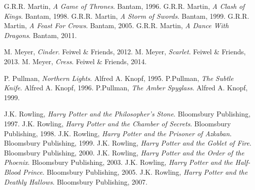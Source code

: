 \begin{thebibliography}{47}
    G.R.R. Martin,
    \emph{A Game of Thrones}.
    Bantam, 
    1996.       
    G.R.R. Martin,
    \emph{A Clash of Kings}.
    Bantam, 
    1998.       
    G.R.R. Martin,
    \emph{A Storm of Swords}.
    Bantam, 
    1999.       
    G.R.R. Martin,
    \emph{A Feast For Crows}.
    Bantam, 
    2005.       
    G.R.R. Martin,
    \emph{A Dance With Dragons}.
    Bantam, 
    2011.  

    M. Meyer,
    \emph{Cinder}.
    Feiwel \& Friends,
    2012.
    M. Meyer,
    \emph{Scarlet}.
    Feiwel \& Friends,
    2013.
    M. Meyer,
    \emph{Cress}.
    Feiwel \& Friends,
    2014.

    P. Pullman,
    \emph{Northern Lights}.
    Alfred A. Knopf, 
    1995.     
    P.Pullman,
    \emph{The Subtle Knife}.
    Alfred A. Knopf, 
    1996.   
    P.Pullman,
    \emph{The Amber Spyglass}.
    Alfred A. Knopf, 
    1999.   

    J.K. Rowling,
    \emph{Harry Potter and the Philosopher's Stone}.
    Bloomsbury Publishing, 
    1997.  
    J.K. Rowling,
    \emph{Harry Potter and the Chamber of Secrets}.
    Bloomsbury Publishing, 
    1998.  
    J.K. Rowling,
    \emph{Harry Potter and the Prisoner of Azkaban}.
    Bloomsbury Publishing, 
    1999.  
    J.K. Rowling,
    \emph{Harry Potter and the Goblet of Fire}.
    Bloomsbury Publishing, 
    2000.  
    J.K. Rowling,
    \emph{Harry Potter and the Order of the Phoenix}.
    Bloomsbury Publishing, 
    2003.  
    J.K. Rowling,
    \emph{Harry Potter and the Half-Blood Prince}.
    Bloomsbury Publishing, 
    2005.  
    J.K. Rowling,
    \emph{Harry Potter and the Deathly Hallows}.
    Bloomsbury Publishing, 
    2007.
\end{thebibliography}


